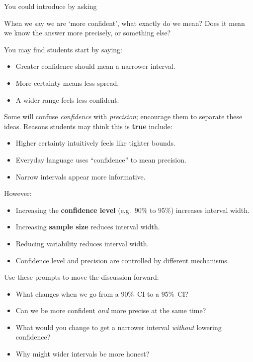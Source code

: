 \documentclass[
  11pt,
  a4paper,
  krantz2]{krantz}
\makeatletter
\providecommand{\tightlist}{%
  \setlength{\itemsep}{0pt}\setlength{\parskip}{0pt}}
\renewenvironment{quote}%
{\begin{kframe}}
{\end{kframe}}
\newenvironment{kframe}{%
\medskip{}
\setlength{\fboxsep}{.8em}
 \def\at@end@of@kframe{}%
 \ifinner\ifhmode%
  \def\at@end@of@kframe{\end{minipage}}%
  \begin{minipage}{\columnwidth}%
 \fi\fi%
 \def\FrameCommand##1{\hskip\@totalleftmargin \hskip-\fboxsep
 \colorbox{shadecolor}{##1}\hskip-\fboxsep
     \hskip-\linewidth \hskip-\@totalleftmargin \hskip\columnwidth}%
 \MakeFramed {\advance\hsize-\width
   \@totalleftmargin\z@ \linewidth\hsize
   \@setminipage}}%
 {\par\unskip\endMakeFramed%
 \at@end@of@kframe}
\renewenvironment{quote}
               {\list{}{\vspace{-0.5em}\begin{kframe}\small%
                        \rightmargin   \leftmargin
                        \parsep        \z@ \@plus\p@}%
                \item\relax}
               {\end{kframe}\endlist}
\makeatother
\begin{document}
You could introduce by asking

\begin{quote}
When we say we are `more confident', what exactly do we mean?
Does it mean we know the answer more precisely, or something else?
\end{quote}

You may find students start by saying:

\begin{itemize}
\tightlist
\item
  Greater confidence should mean a narrower interval.
\item
  More certainty means less spread.
\item
  A wider range feels less confident.
\end{itemize}

Some will confuse \emph{confidence} with \emph{precision}; encourage them to separate these ideas.
Reasons students may think this is \textbf{true} include:

\begin{itemize}
\tightlist
\item
  Higher certainty intuitively feels like tighter bounds.
\item
  Everyday language uses ``confidence'' to mean precision.
\item
  Narrow intervals appear more informative.
\end{itemize}

However:

\begin{itemize}
\tightlist
\item
  Increasing the \textbf{confidence level} (e.g.~\(90\)\% to \(95\)\%) increases interval width.
\item
  Increasing \textbf{sample size} reduces interval width.
\item
  Reducing variability reduces interval width.
\item
  Confidence level and precision are controlled by different mechanisms.
\end{itemize}

Use these prompts to move the discussion forward:

\begin{itemize}
\tightlist
\item
  What changes when we go from a \(90\)\%~CI to a \(95\)\%~CI?
\item
  Can we be more confident \emph{and} more precise at the same time?
\item
  What would you change to get a narrower interval \emph{without} lowering confidence?
\item
  Why might wider intervals be more honest?
\end{itemize}
\end{document}
